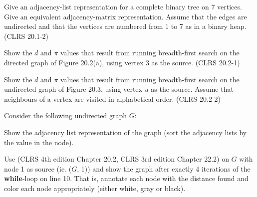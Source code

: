 \documentclass{article}
\begin{document}
\thispagestyle{fancy}

\begin{Exercise}[title={Simple training exercises}]
    \Question
    Give an adjacency-list representation for a complete binary tree on 7
    vertices. Give an equivalent adjacency-matrix representation. Assume that
    the edges are undirected and that the vertices are numbered from 1 to 7 as
    in a binary heap. (CLRS 20.1-2)

    \Question
    Show the $d$ and $\pi$ values that result from running breadth-first search
    on the directed graph of Figure 20.2(a), using vertex $3$ as the source.
    (CLRS 20.2-1)

    \Question
    Show the $d$ and $\pi$ values that result from running breadth-first search
    on the undirected graph of Figure 20.3, using vertex $u$ as the source.
    Assume that neighbours of a vertex are visited in alphabetical order. (CLRS
    20.2-2)

\end{Exercise}

\begin{Exercise}[title={Question from Re-exam 2024}]
    \noindent
    Consider the following undirected graph $G$:

    \begin{center}
    \end{center}

    \Question
    Show the adjacency list representation of the graph (sort the adjacency
    lists by the value in the node).

    \Question
    Use  (CLRS 4th edition Chapter 20.2, CLRS 3rd edition Chapter
    22.2) on $G$ with node 1 as source (ie.  ($G$, 1)) and show the
    graph after exactly 4 iterations of the \textbf{while}-loop on line 10. That
    is, annotate each node with the distance found and color each node
    appropriately (either white, gray or black).


    
\end{Exercise}
\end{document}
